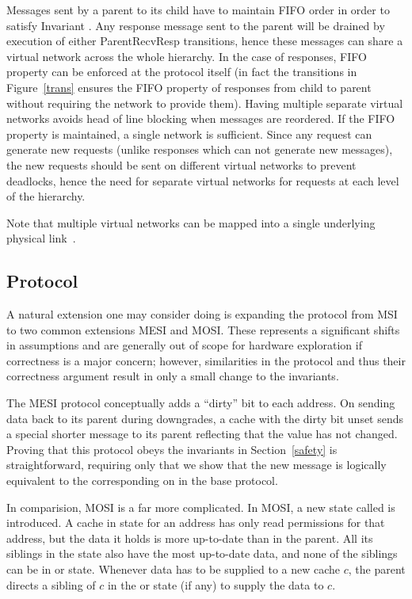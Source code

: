 Messages sent by a parent to its child have to maintain FIFO order in
order to satisfy Invariant . Any response message
sent to the parent will be drained by execution of either
ParentRecvResp transitions, hence these messages can share a virtual
network across the whole hierarchy. In the case of responses, FIFO
property can be enforced at the protocol itself (in fact the
transitions in Figure~\ref{trans} ensures the FIFO property of
responses from child to parent without requiring the network to
provide them). Having multiple separate virtual networks avoids head
of line blocking when messages are reordered. If the FIFO property is
maintained, a single network is sufficient. Since any request can
generate new requests (unlike responses which can not generate new
messages), the new requests should be sent on different virtual
networks to prevent deadlocks, hence the need for separate virtual
networks for requests at each level of the hierarchy.

Note that multiple virtual networks can be mapped into a single
underlying physical link~\cite{noc-funda}.


\subsection{Protocol}

A natural extension one may consider doing is expanding the protocol
from MSI to two common extensions MESI and MOSI. These represents a
significant shifts in assumptions and are generally out of scope for
hardware exploration if correctness is a major concern; however,
similarities in the protocol and thus their correctness argument
result in only a small change to the invariants. 

The MESI protocol conceptually adds a ``dirty'' bit to each
address. On sending data back to its parent during downgrades, a cache
with the dirty bit unset sends a special shorter message to its parent
reflecting that the value has not changed. Proving that this protocol
obeys the invariants in Section~\ref{safety} is straightforward,
requiring only that we show that the new message is logically
equivalent to the corresponding on in the base protocol.

In comparision, MOSI is a far more complicated. In MOSI, a new state
called \Ow{} is introduced. A cache in \Ow{} state for an address has
only read permissions for that address, but the data it holds is more
up-to-date than in the parent.  All its siblings in the \Sh{} state
also have the most up-to-date data, and none of the siblings can be in
\Mo{} or \Ow{} state.  Whenever data has to be supplied to a new cache
$c$, the parent directs a sibling of $c$ in the \Ow{} or \Mo{} state
(if any) to supply the data to $c$.


